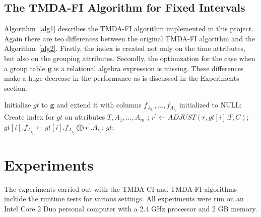 \documentclass[a4paper,11pt]{article}
\renewcommand{\vec}[1]{\mathbf{#1}}
\begin{document}
\subsection{The TMDA-FI Algorithm for Fixed Intervals}

Algorithm~\ref{alg1} describes the TMDA-FI algorithm implemented in this project. Again there are teo differences between the original TMDA-FI algorithm and the Algorithm~\ref{alg2}. Firstly, the index is created not only on the time attributes, but also on the grouping attributes. Secondly, the optimization for the case when a group table $\vec{g}$ is a relational algebra expression is missing. These differences make a huge decrease in the performance as is discussed in the Experiments section.

\begin{algorithm}
\caption{$\operatorname{TMDA-FI}(\vec{g}, \vec{r}, \vec{F}, \theta, C)$}
\label{alg2}
\begin{algorithmic}
\STATE Initialize $gt$ to $\vec{g}$ and extend it with columns $f_{A_{i_1}} , \dots , f_{A_{i_p}}$ initialized to NULL;
\STATE Create index for $gt$ on attributes $T, A_1,\dots,A_m$ ;
\FORALL{tuple $r \in \vec{r}$} 
\STATE $r^{'} \leftarrow ADJUST(r, gt[i].T, C)$; 
\FORALL{$f_j \in \vec{F}$}
\STATE $gt[i].f_{A_{i_j}} \leftarrow gt[i].f_{A_{i_j}} \bigoplus r^{'}.A_{i_1}$; 
\ENDFOR
\ENDFOR
\ENDFOR
\RETURN $gt$;
\end{algorithmic}
\end{algorithm}



\section{Experiments}

The experiments carried out with the TMDA-CI and TMDA-FI algorithms include the runtime tests for various settings. All experiments were run on an Intel Core 2 Duo personal computer with a 2.4 GHz processor and 2 GB memory.
\end{document}
